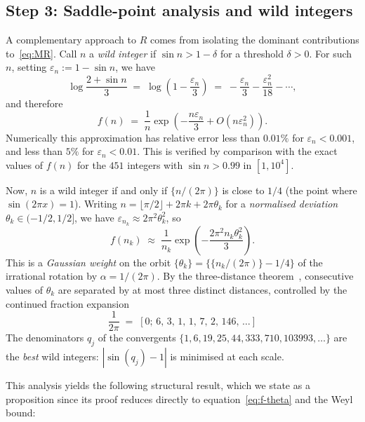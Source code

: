 \documentclass[12pt]{amsart}
\begin{document}
\subsection{Step 3: Saddle-point analysis and wild integers}

A complementary approach to $R$ comes from isolating the dominant
contributions to~\eqref{eq:MR}.  Call $n$ a \emph{wild integer} if
$\sin n>1-\delta$ for a threshold $\delta>0$.  For such $n$, setting
$\varepsilon_n:=1-\sin n$, we have
\begin{equation}\label{eq:saddle}
  \log\frac{2+\sin n}{3}
  \;=\; \log\!\left(1-\frac{\varepsilon_n}{3}\right)
  \;=\; -\frac{\varepsilon_n}{3} - \frac{\varepsilon_n^2}{18}
        - \cdots,
\end{equation}
and therefore
\begin{equation}\label{eq:f-saddle}
  f(n) \;=\; \frac{1}{n}\exp\!\left(-\frac{n\varepsilon_n}{3}
             + O(n\varepsilon_n^2)\right).
\end{equation}
Numerically this approximation has relative error less than
$0.01\%$ for $\varepsilon_n < 0.001$, and less than $5\%$ for
$\varepsilon_n < 0.01$.  This is verified by comparison with the
exact values of $f(n)$ for the $451$ integers with $\sin n>0.99$
in $[1,10^4]$.

Now, $n$ is a wild integer if and only if
$\{n/(2\pi)\}$ is close to $1/4$ (the point where $\sin(2\pi x)=1$).
Writing $n=\lfloor\pi/2\rfloor+2\pi k+2\pi\theta_k$ for a
\emph{normalised deviation} $\theta_k\in(-1/2,1/2]$, we have
$\varepsilon_{n_k}\approx 2\pi^2\theta_k^2$, so
\begin{equation}\label{eq:f-theta}
  f(n_k) \;\approx\; \frac{1}{n_k}
          \exp\!\!\left(-\frac{2\pi^2 n_k\theta_k^2}{3}\right).
\end{equation}
This is a \emph{Gaussian weight} on the orbit
$\{\theta_k\}=\{\{n_k/(2\pi)\}-1/4\}$ of the irrational rotation by
$\alpha=1/(2\pi)$.  By the three-distance theorem~\cite{Steinhaus1958},
consecutive values of $\theta_k$ are separated by at most three
distinct distances, controlled by the continued fraction expansion
\[
  \frac{1}{2\pi}
  \;=\; [0;\,6,\,3,\,1,\,1,\,7,\,2,\,146,\,\ldots]
\]
The denominators $q_j$ of the convergents
$\{1,6,19,25,44,333,710,103993,\ldots\}$ are the \emph{best}
wild integers: $|\sin(q_j)-1|$ is minimised at each scale.

This analysis yields the following structural result, which
we state as a proposition since its proof reduces directly to
equation~\eqref{eq:f-theta} and the Weyl bound:
\end{document}

